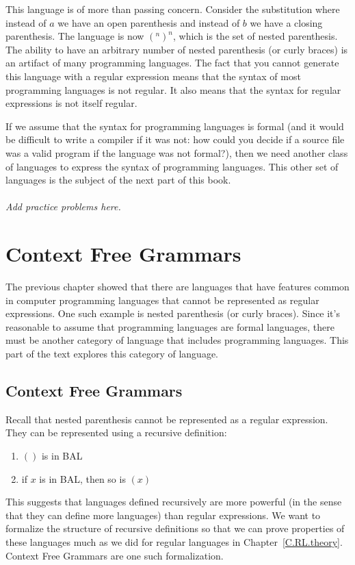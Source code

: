 \documentclass[letterpaper,12pt,openany,reqno]{book}%
\newcommand{\needsproblems}{\paragraph{Add practice problems here.}}
\begin{document}
This language is of more than passing concern. Consider the substitution where instead of $a$ we have an open parenthesis and instead of $b$ we have a closing parenthesis. The language is now $(^n )^n$, which is the set of nested parenthesis. The ability to have an arbitrary number of nested parenthesis (or curly braces) is an artifact of many programming languages. The fact that you cannot generate this language with a regular expression means that the syntax of most programming languages is not regular. It also means that the syntax for regular expressions is not itself regular.

If we assume that the syntax for programming languages is formal (and it would be difficult to write a compiler if it was not: how could you decide if a source file was a valid program if the language was not formal?), then we need another class of languages to express the syntax of programming languages. This other set of languages is the subject of the next part of this book.

\needsproblems

\part{Context Free Grammars}
The previous chapter showed that there are languages that have features common in computer programming languages that cannot be represented as regular expressions. One such example is nested parenthesis (or curly braces). Since it's reasonable to assume that programming languages are formal languages, there must be another category of language that includes programming languages. This part of the text explores this category of language.

\chapter{Context Free Grammars}

Recall that nested parenthesis cannot be represented as a regular expression. They can be represented using a recursive definition:
\begin{enumerate}
\item $()$ is in BAL
\item if $x$ is in BAL, then so is $(x)$
\end{enumerate}

This suggests that languages defined recursively are more powerful (in the sense that they can define more languages) than regular expressions. We want to formalize the structure of recursive definitions so that we can prove properties of these languages much as we did for regular languages in Chapter~\ref{C.RL.theory}. Context Free Grammars are one such formalization.
\end{document}
